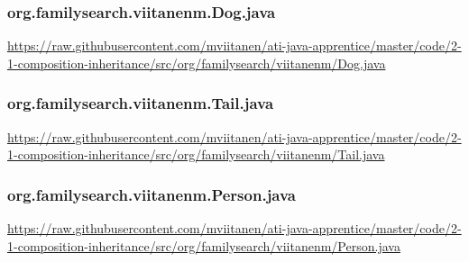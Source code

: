 \vspace{1em}
\subsubsection*{org.familysearch.viitanenm.Dog.java}
\noindent
\begin{minipage}{.6in}
\end{minipage}
\begin{minipage}{6in}
  \url{https://raw.githubusercontent.com/mviitanen/ati-java-apprentice/master/code/2-1-composition-inheritance/src/org/familysearch/viitanenm/Dog.java}
\end{minipage}

\vspace{1em}
\subsubsection*{org.familysearch.viitanenm.Tail.java}
\noindent
\begin{minipage}{.6in}
\end{minipage}
\begin{minipage}{6in}
  \url{https://raw.githubusercontent.com/mviitanen/ati-java-apprentice/master/code/2-1-composition-inheritance/src/org/familysearch/viitanenm/Tail.java}
\end{minipage}

\vspace{1em}
\subsubsection*{org.familysearch.viitanenm.Person.java}
\noindent
\begin{minipage}{.6in}
\end{minipage}
\begin{minipage}{6in}
  \url{https://raw.githubusercontent.com/mviitanen/ati-java-apprentice/master/code/2-1-composition-inheritance/src/org/familysearch/viitanenm/Person.java}
\end{minipage}
